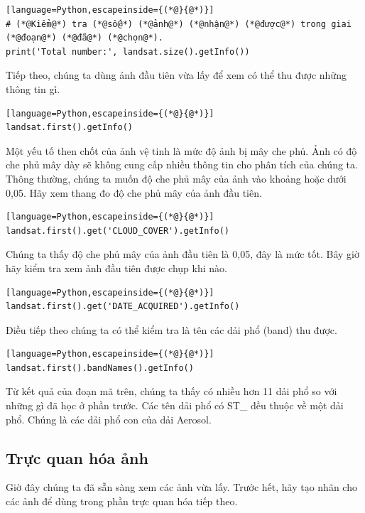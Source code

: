 \begin{lstlisting}[language=Python,escapeinside={(*@}{@*)}]
# (*@Kiểm@*) tra (*@số@*) (*@ảnh@*) (*@nhận@*) (*@được@*) trong giai (*@đoạn@*) (*@đã@*) (*@chọn@*).
print('Total number:', landsat.size().getInfo())
\end{lstlisting}

Tiếp theo, chúng ta dùng ảnh đầu tiên vừa lấy để xem có thể thu được những thông tin gì.

\begin{lstlisting}[language=Python,escapeinside={(*@}{@*)}]
landsat.first().getInfo()
\end{lstlisting}

Một yếu tố then chốt của ảnh vệ tinh là mức độ ảnh bị mây che phủ. Ảnh có độ che phủ mây dày sẽ không cung cấp nhiều thông tin cho phân tích của chúng ta. Thông thường, chúng ta muốn độ che phủ mây của ảnh vào khoảng hoặc dưới 0,05. Hãy xem thang đo độ che phủ mây của ảnh đầu tiên.

\begin{lstlisting}[language=Python,escapeinside={(*@}{@*)}]
landsat.first().get('CLOUD_COVER').getInfo()
\end{lstlisting}

Chúng ta thấy độ che phủ mây của ảnh đầu tiên là 0,05, đây là mức tốt. Bây giờ hãy kiểm tra xem ảnh đầu tiên được chụp khi nào.

\begin{lstlisting}[language=Python,escapeinside={(*@}{@*)}]
landsat.first().get('DATE_ACQUIRED').getInfo()
\end{lstlisting}

Điều tiếp theo chúng ta có thể kiểm tra là tên các dải phổ (band) thu được.

\begin{lstlisting}[language=Python,escapeinside={(*@}{@*)}]
landsat.first().bandNames().getInfo()
\end{lstlisting}

Từ kết quả của đoạn mã trên, chúng ta thấy có nhiều hơn 11 dải phổ so với những gì đã học ở phần trước. Các tên dải phổ có \textquotesingle ST\_\textquotesingle{} đều thuộc về một dải phổ. Chúng là các dải phổ con của dải Aerosol.

\subsection{Trực quan hóa ảnh}

Giờ đây chúng ta đã sẵn sàng xem các ảnh vừa lấy. Trước hết, hãy tạo nhãn cho các ảnh để dùng trong phần trực quan hóa tiếp theo.

